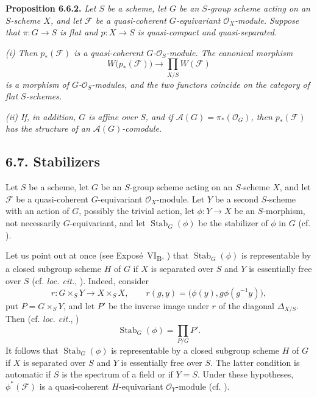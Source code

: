 \medskip
\noindent{}\textbf{Proposition 6.6.2.}
\textit{Let \(S\) be a scheme, let \(G\) be an \(S\)-group scheme
acting on an \(S\)-scheme \(X\), and let \(\mathcal F\) be a
quasi-coherent \(G\)-equivariant \(\mathcal O_X\)-module. Suppose that
\(\pi:G\to S\) is flat and \(p:X\to S\) is quasi-compact and
quasi-separated.}

\textit{(i) Then \(p_*(\mathcal F)\) is a quasi-coherent
\(G\)-\(\mathcal O_S\)-module. The canonical morphism}
\[
  W\bigl(p_*(\mathcal F)\bigr)
  \longrightarrow\prod_{X/S}W(\mathcal F)
\]
\textit{is a morphism of \(G\)-\(\mathcal O_S\)-modules, and the two
functors coincide on the category of flat \(S\)-schemes.}

\textit{(ii) If, in addition, \(G\) is affine over \(S\), and if
\(\mathscr A(G)=\pi_*(\mathcal O_G)\), then \(p_*(\mathcal F)\) has
the structure of an \(\mathscr A(G)\)-comodule.}

\subsection*{6.7. Stabilizers}

Let \(S\) be a scheme, let \(G\) be an \(S\)-group scheme acting on an
\(S\)-scheme \(X\), and let \(\mathcal F\) be a quasi-coherent
\(G\)-equivariant \(\mathcal O_X\)-module. Let \(Y\) be a second
\(S\)-scheme with an action of \(G\), possibly the trivial action, let
\(\phi:Y\to X\) be an \(S\)-morphism, not necessarily
\(G\)-equivariant, and let \(\operatorname{Stab}_G(\phi)\) be the
stabilizer of \(\phi\) in \(G\) (cf. ).

Let us point out at once (see Expos\'e~VI\textsubscript{B},
) that \(\operatorname{Stab}_G(\phi)\) is representable by a
closed subgroup scheme \(H\) of \(G\) if \(X\) is separated over
\(S\) and \(Y\) is essentially free over \(S\) (cf.
\emph{loc. cit.}, ). Indeed, consider
\[
  r:G\times_SY\longrightarrow X\times_SX,
  \qquad
  r(g,y)=\bigl(\phi(y),g\phi(g^{-1}y)\bigr),
\]
put \(P=G\times_SY\), and let \(P'\) be the inverse image under \(r\)
of the diagonal \(\Delta_{X/S}\). Then (cf. \emph{loc. cit.},
)
\[
  \operatorname{Stab}_G(\phi)=\prod_{P/G}P'.
\]
It follows that \(\operatorname{Stab}_G(\phi)\) is representable by a
closed subgroup scheme \(H\) of \(G\) if \(X\) is separated over
\(S\) and \(Y\) is essentially free over \(S\). The latter condition
is automatic if \(S\) is the spectrum of a field or if \(Y=S\).
Under these hypotheses, \(\phi^*(\mathcal F)\) is a quasi-coherent
\(H\)-equivariant \(\mathcal O_Y\)-module (cf. ).

